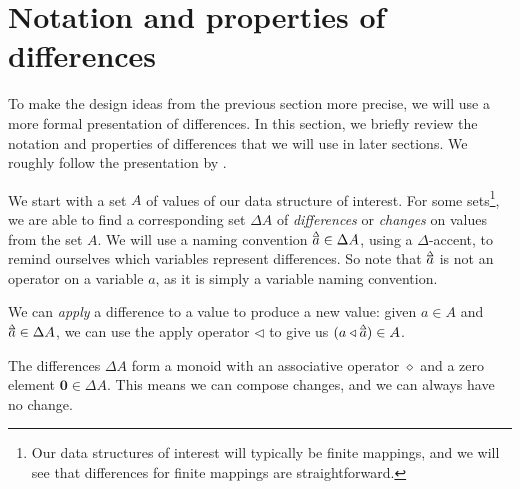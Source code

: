 \documentclass[11pt,a4paper]{article}
\newcommand\deltavar[1]{\accentset{\Delta}{#1}}
\begin{document}
\section{Notation and properties of differences}
\label{notation-differences}

To make the design ideas from the previous section more precise, we will use a
more formal presentation of differences.
In this section, we briefly review the notation and properties of differences
that we will use in later sections. We roughly follow the presentation by
\citet{change-calculus}.

We start with a set $A$ of values of our data structure of interest. For some
sets\footnote{Our data structures of interest will typically be
finite mappings, and we will see that differences for
finite mappings are straightforward.}, we are able to find a corresponding
set $\Delta{A}$ of \emph{differences} or \emph{changes} on values from the set
$A$. We will use a naming convention $\deltavar{a} \in \Delta{A}$, using a
$\Delta$-accent, to remind ourselves which variables represent differences.
So note that $\deltavar{a}$ is not an operator on a variable $a$, as it is simply a
variable naming convention.

We can \emph{apply} a difference to a value to produce a new value: given
$a \in A$ and $\deltavar{a} \in \Delta{A}$, we can use the apply operator
$\triangleleft$ to give us $(a \triangleleft \deltavar{a}) \in A$.

The differences $\Delta{A}$ form a monoid with an associative operator
$\diamond$ and a zero element $\mathbf{0} \in \Delta{A}$. This means we can
compose changes, and we can always have no change.
\end{document}
